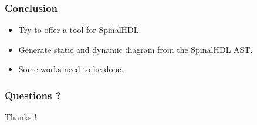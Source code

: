 \documentclass[11pt, handout]{beamer}
\begin{document}
\begin{frame}
  \frametitle{Conclusion}
  \begin{itemize}
  \item Try to offer a tool for SpinalHDL.
  \item Generate static and dynamic diagram from the SpinalHDL AST.
  \item Some works need to be done.
  \end{itemize}
\end{frame}

\begin{frame}
  \frametitle{Questions ?}
  \begin{tcolorbox}
  \begin{center}
    \Huge Thanks !
  \end{center}
  \end{tcolorbox}
\end{frame}
\end{document}
